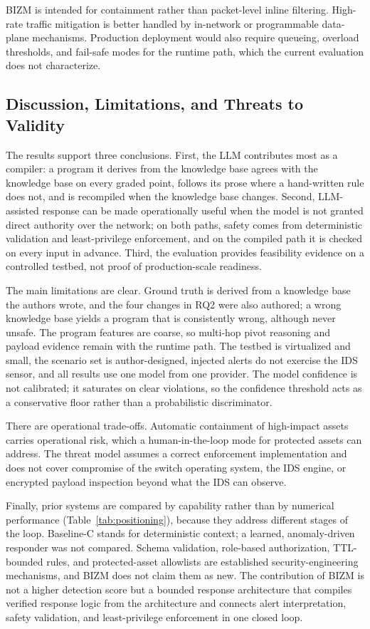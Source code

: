 \documentclass[final,5p]{elsarticle}
\begin{document}
BIZM is intended for containment rather than packet-level inline filtering. High-rate traffic mitigation is better handled by in-network or programmable data-plane mechanisms. Production deployment would also require queueing, overload thresholds, and fail-safe modes for the runtime path, which the current evaluation does not characterize.

\subsection{Discussion, Limitations, and Threats to Validity}
\label{sec:discussion_validity}

The results support three conclusions. First, the LLM contributes most as a compiler: a program it derives from the knowledge base agrees with the knowledge base on every graded point, follows its prose where a hand-written rule does not, and is recompiled when the knowledge base changes. Second, LLM-assisted response can be made operationally useful when the model is not granted direct authority over the network; on both paths, safety comes from deterministic validation and least-privilege enforcement, and on the compiled path it is checked on every input in advance. Third, the evaluation provides feasibility evidence on a controlled testbed, not proof of production-scale readiness.

The main limitations are clear. Ground truth is derived from a knowledge base the authors wrote, and the four changes in RQ2 were also authored; a wrong knowledge base yields a program that is consistently wrong, although never unsafe. The program features are coarse, so multi-hop pivot reasoning and payload evidence remain with the runtime path. The testbed is virtualized and small, the scenario set is author-designed, injected alerts do not exercise the IDS sensor, and all results use one model from one provider. The model confidence is not calibrated; it saturates on clear violations, so the confidence threshold acts as a conservative floor rather than a probabilistic discriminator.

There are operational trade-offs. Automatic containment of high-impact assets carries operational risk, which a human-in-the-loop mode for protected assets can address. The threat model assumes a correct enforcement implementation and does not cover compromise of the switch operating system, the IDS engine, or encrypted payload inspection beyond what the IDS can observe.

Finally, prior systems are compared by capability rather than by numerical performance (Table~\ref{tab:positioning}), because they address different stages of the loop. Baseline-C stands for deterministic context; a learned, anomaly-driven responder was not compared. Schema validation, role-based authorization, TTL-bounded rules, and protected-asset allowlists are established security-engineering mechanisms, and BIZM does not claim them as new. The contribution of BIZM is not a higher detection score but a bounded response architecture that compiles verified response logic from the architecture and connects alert interpretation, safety validation, and least-privilege enforcement in one closed loop.
\end{document}
